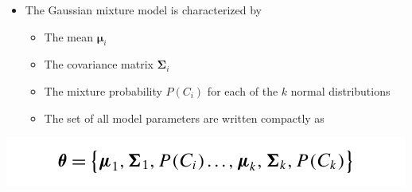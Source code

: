 \documentclass[11pt]{article}
\begin{document}
\begin{itemize}
\item The Gaussian mixture model is characterized by
\begin{itemize}
\item The mean \(\pmb \mu_i\)
\item The covariance matrix \(\mathbf \Sigma_i\)
\item The mixture probability \(P(C_i)\) for each of the \(k\) normal distributions
\item The set of all model parameters are written compactly as
\end{itemize}
\end{itemize}
\begin{center}
\includegraphics[width=.9\linewidth]{Representative-based Clustering/screenshot_2018-11-27_19-37-51.png}
\end{center}
\end{document}

